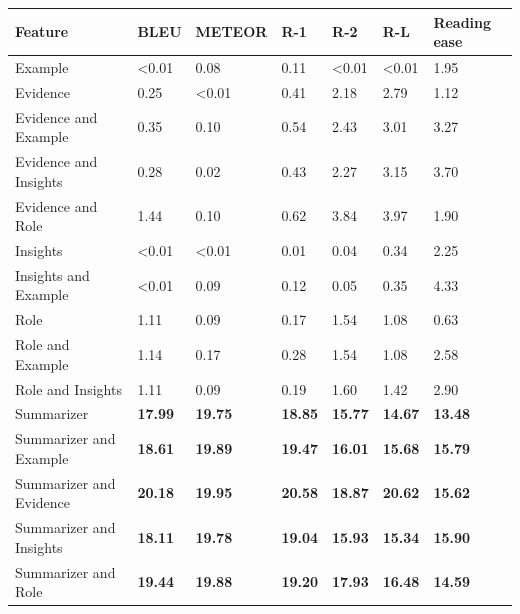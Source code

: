 \begin{tabular}{|l|l|l|l|l|l|l|}
\hline
\textbf{Feature} & BLEU & METEOR & R-1 & R-2 & R-L & Reading ease \\
 \hline
 Example & \textless{}0.01 & 0.08 & 0.11 & \textless{}0.01 & \textless{}0.01 & 1.95 \\
 \hline
 Evidence & 0.25 & \textless{}0.01 & 0.41 & 2.18 & 2.79 & 1.12 \\
 \hline
 Evidence and Example & 0.35 & 0.10 & 0.54 & 2.43 & 3.01 & 3.27 \\
 \hline
 Evidence and Insights & 0.28 & 0.02 & 0.43 & 2.27 & 3.15 & 3.70 \\
 \hline
 Evidence and Role & 1.44 & 0.10 & 0.62 & 3.84 & 3.97 & 1.90 \\
 \hline
 Insights & \textless{}0.01 & \textless{}0.01 & 0.01 & 0.04 & 0.34 & 2.25 \\
 \hline
 Insights and Example & \textless{}0.01 & 0.09 & 0.12 & 0.05 & 0.35 & 4.33 \\
 \hline
 Role & 1.11 & 0.09 & 0.17 & 1.54 & 1.08 & 0.63 \\
 \hline
 Role and Example & 1.14 & 0.17 & 0.28 & 1.54 & 1.08 & 2.58 \\
 \hline
 Role and Insights & 1.11 & 0.09 & 0.19 & 1.60 & 1.42 & 2.90 \\
 \hline
 Summarizer & \textbf{17.99} & \textbf{19.75} & \textbf{18.85} & \textbf{15.77} & \textbf{14.67} & \textbf{13.48} \\
 \hline
 Summarizer and Example & \textbf{18.61} & \textbf{19.89} & \textbf{19.47} & \textbf{16.01} & \textbf{15.68} & \textbf{15.79} \\
 \hline
 Summarizer and Evidence & \textbf{20.18} & \textbf{19.95} & \textbf{20.58} & \textbf{18.87} & \textbf{20.62} & \textbf{15.62} \\
 \hline
 Summarizer and Insights & \textbf{18.11} & \textbf{19.78} & \textbf{19.04} & \textbf{15.93} & \textbf{15.34} & \textbf{15.90} \\
 \hline
 Summarizer and Role & \textbf{19.44} & \textbf{19.88} & \textbf{19.20} & \textbf{17.93} & \textbf{16.48} & \textbf{14.59} \\
\hline
\end{tabular}
